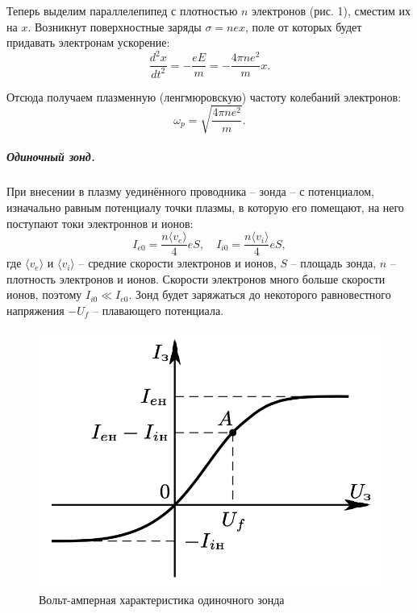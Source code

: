\documentclass[12pt,a4paper]{article}
\begin{document}
Теперь выделим параллелепипед с плотностью $n$ электронов (рис. 1), сместим их на $x$. 
Возникнут поверхностные заряды $\sigma = nex$, поле от которых будет придавать электронам ускорение:
\[\dfrac{d^2x}{dt^2}=-\dfrac{eE}{m}=-\dfrac{4\pi n e^2}{m}x.\]

Отсюда получаем плазменную (ленгмюровскую) частоту колебаний электронов:
\begin{equation}
    \omega_p = \sqrt{\dfrac{4\pi ne^2}{m}}.
\end{equation}

\subparagraph*{Одиночный зонд.}
При внесении в плазму уединённого проводника -- зонда -- с потенциалом, изначально равным потенциалу точки плазмы, в которую его помещают, на него поступают токи электроннов и ионов:
\begin{equation}
        I_{e0} = \dfrac{n \langle v_e \rangle}{4}eS,\quad I_{i0} = \dfrac{n \langle v_i \rangle}{4}eS,
\end{equation}
где $\langle v_e \rangle$ и $\langle v_i \rangle$ -- средние скорости электронов и ионов, $S$ -- площадь зонда, $n$ -- плотность электронов и ионов. 
Скорости электронов много больше скорости ионов, поэтому $I_{i0} \ll I_{e0}$. 
Зонд будет заряжаться до некоторого равновестного напряжения $-U_f$ -- плавающего потенциала.\\

\begin{figure}
    \includegraphics[width=\linewidth]{pics/2.png}
    \caption{\small{Вольт-амперная характеристика одиночного зонда}}
\end{figure}  
\end{document}
